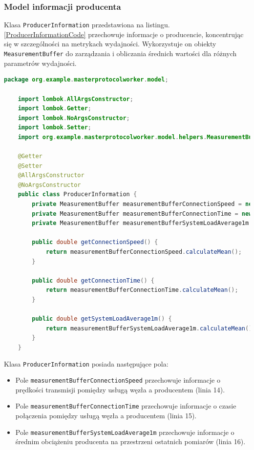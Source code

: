 \subsubsection{Model informacji producenta}

Klasa \verb|ProducerInformation| przedstawiona na listingu.\ref{ProducerInformationCode} przechowuje informacje o producencie, koncentrując się w szczególności na metrykach wydajności. Wykorzystuje on obiekty \verb|MeasurementBuffer| do zarządzania i obliczania średnich wartości dla różnych parametrów wydajności. 


\begin{lstlisting}[language=Java, caption=Kod klasy ProducerInformation,label=ProducerInformationCode]
    package org.example.masterprotocolworker.model;

    import lombok.AllArgsConstructor;
    import lombok.Getter;
    import lombok.NoArgsConstructor;
    import lombok.Setter;
    import org.example.masterprotocolworker.model.helpers.MeasurementBuffer;
    
    @Getter
    @Setter
    @AllArgsConstructor
    @NoArgsConstructor
    public class ProducerInformation {
        private MeasurementBuffer measurementBufferConnectionSpeed = new MeasurementBuffer();
        private MeasurementBuffer measurementBufferConnectionTime = new MeasurementBuffer();
        private MeasurementBuffer measurementBufferSystemLoadAverage1m = new MeasurementBuffer();
    
        public double getConnectionSpeed() {
            return measurementBufferConnectionSpeed.calculateMean();
        }
    
        public double getConnectionTime() {
            return measurementBufferConnectionTime.calculateMean();
        }
    
        public double getSystemLoadAverage1m() {
            return measurementBufferSystemLoadAverage1m.calculateMean();
        }
    }
\end{lstlisting}

Klasa \verb|ProducerInformation| posiada następujące pola:

\begin{itemize}
    \item Pole \verb|measurementBufferConnectionSpeed| przechowuje informacje o prędkości transmisji pomiędzy usługą węzła a producentem (linia 14).
    \item Pole \verb|measurementBufferConnectionTime| przechowuje informacje o czasie połączenia pomiędzy usługą węzła a producentem (linia 15).
    \item Pole \verb|measurementBufferSystemLoadAverage1m| przechowuje informacje o średnim obciążeniu producenta na przestrzeni ostatnich pomiarów (linia 16).
\end{itemize}

